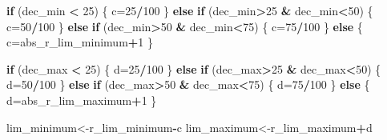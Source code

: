 \documentclass[
]{book}
\newenvironment{Shaded}{\begin{snugshade}}{\end{snugshade}}
\newcommand{\ControlFlowTok}[1]{\textcolor[rgb]{0.13,0.29,0.53}{\textbf{#1}}}
\newcommand{\DecValTok}[1]{\textcolor[rgb]{0.00,0.00,0.81}{#1}}
\newcommand{\NormalTok}[1]{#1}
\newcommand{\OtherTok}[1]{\textcolor[rgb]{0.56,0.35,0.01}{#1}}
\newcommand{\SpecialCharTok}[1]{\textcolor[rgb]{0.81,0.36,0.00}{\textbf{#1}}}
\begin{document}
\begin{Shaded}
\begin{Highlighting}[]
  \ControlFlowTok{if}\NormalTok{ (dec\_min }\SpecialCharTok{\textless{}} \DecValTok{25}\NormalTok{) \{}
\NormalTok{    c}\OtherTok{=}\DecValTok{25}\SpecialCharTok{/}\DecValTok{100}
\NormalTok{  \} }\ControlFlowTok{else} \ControlFlowTok{if}\NormalTok{ (dec\_min}\SpecialCharTok{\textgreater{}}\DecValTok{25} \SpecialCharTok{\&}\NormalTok{ dec\_min}\SpecialCharTok{\textless{}}\DecValTok{50}\NormalTok{) \{}
\NormalTok{    c}\OtherTok{=}\DecValTok{50}\SpecialCharTok{/}\DecValTok{100}
\NormalTok{  \} }\ControlFlowTok{else} \ControlFlowTok{if}\NormalTok{ (dec\_min}\SpecialCharTok{\textgreater{}}\DecValTok{50} \SpecialCharTok{\&}\NormalTok{ dec\_min}\SpecialCharTok{\textless{}}\DecValTok{75}\NormalTok{) \{}
\NormalTok{    c}\OtherTok{=}\DecValTok{75}\SpecialCharTok{/}\DecValTok{100}
\NormalTok{  \} }\ControlFlowTok{else}\NormalTok{ \{}
\NormalTok{    c}\OtherTok{=}\NormalTok{abs\_r\_lim\_minimum}\SpecialCharTok{+}\DecValTok{1}
\NormalTok{  \}}
  
  \ControlFlowTok{if}\NormalTok{ (dec\_max }\SpecialCharTok{\textless{}} \DecValTok{25}\NormalTok{) \{}
\NormalTok{    d}\OtherTok{=}\DecValTok{25}\SpecialCharTok{/}\DecValTok{100}
\NormalTok{  \} }\ControlFlowTok{else} \ControlFlowTok{if}\NormalTok{ (dec\_max}\SpecialCharTok{\textgreater{}}\DecValTok{25} \SpecialCharTok{\&}\NormalTok{ dec\_max}\SpecialCharTok{\textless{}}\DecValTok{50}\NormalTok{) \{}
\NormalTok{    d}\OtherTok{=}\DecValTok{50}\SpecialCharTok{/}\DecValTok{100}
\NormalTok{  \} }\ControlFlowTok{else} \ControlFlowTok{if}\NormalTok{ (dec\_max}\SpecialCharTok{\textgreater{}}\DecValTok{50} \SpecialCharTok{\&}\NormalTok{ dec\_max}\SpecialCharTok{\textless{}}\DecValTok{75}\NormalTok{) \{}
\NormalTok{    d}\OtherTok{=}\DecValTok{75}\SpecialCharTok{/}\DecValTok{100}
\NormalTok{  \} }\ControlFlowTok{else}\NormalTok{ \{}
\NormalTok{    d}\OtherTok{=}\NormalTok{abs\_r\_lim\_maximum}\SpecialCharTok{+}\DecValTok{1}
\NormalTok{  \}}
  
\NormalTok{  lim\_minimum}\OtherTok{\textless{}{-}}\NormalTok{r\_lim\_minimum}\SpecialCharTok{{-}}\NormalTok{c}
\NormalTok{  lim\_maximum}\OtherTok{\textless{}{-}}\NormalTok{r\_lim\_maximum}\SpecialCharTok{+}\NormalTok{d}
  

\end{Highlighting}
\end{Shaded}
\end{document}
